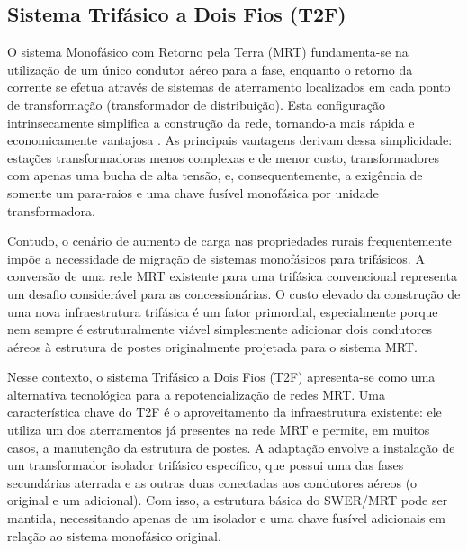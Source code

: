 \documentclass[oneside,openright,12pt]{ufsm_2021} %
\begin{document}
\pagebreak

\subsection{Sistema Trifásico a Dois Fios (T2F)}

\par O sistema Monofásico com Retorno pela Terra (MRT) fundamenta-se na utilização de um único condutor aéreo para a fase, enquanto o retorno da corrente se efetua através de sistemas de aterramento localizados em cada ponto de transformação (transformador de distribuição). Esta configuração intrinsecamente simplifica a construção da rede, tornando-a mais rápida e economicamente vantajosa \cite{kraulich_alise_2024}. As principais vantagens derivam dessa simplicidade: estações transformadoras menos complexas e de menor custo, transformadores com apenas uma bucha de alta tensão, e, consequentemente, a exigência de somente um para-raios e uma chave fusível monofásica por unidade transformadora.

\par Contudo, o cenário de aumento de carga nas propriedades rurais frequentemente impõe a necessidade de migração de sistemas monofásicos para trifásicos. A conversão de uma rede MRT existente para uma trifásica convencional representa um desafio considerável para as concessionárias. O custo elevado da construção de uma nova infraestrutura trifásica é um fator primordial, especialmente porque nem sempre é estruturalmente viável simplesmente adicionar dois condutores aéreos à estrutura de postes originalmente projetada para o sistema MRT.

\par Nesse contexto, o sistema Trifásico a Dois Fios (T2F) apresenta-se como uma alternativa tecnológica para a repotencialização de redes MRT. Uma característica chave do T2F é o aproveitamento da infraestrutura existente: ele utiliza um dos aterramentos já presentes na rede MRT e permite, em muitos casos, a manutenção da estrutura de postes. A adaptação envolve a instalação de um transformador isolador trifásico específico, que possui uma das fases secundárias aterrada e as outras duas conectadas aos condutores aéreos (o original e um adicional). Com isso, a estrutura básica do SWER/MRT pode ser mantida, necessitando apenas de um isolador e uma chave fusível adicionais em relação ao sistema monofásico original.
\end{document}
